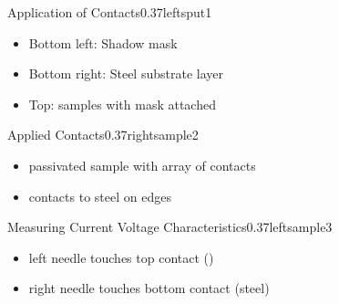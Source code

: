 \documentclass[hyperref={pdfpagelabels=false}, aspectratio=43, t]{beamer}  %
\begin{document}

%
\begin{graphicsFrame}{Application of Contacts}{}{0.37}{left}{sput1}{}
		\begin{itemize}
			\item Bottom left: Shadow mask
			\item Bottom right: Steel substrate  layer
			\item Top: samples with mask attached
		\end{itemize}
\end{graphicsFrame}
%
\begin{graphicsFrame}{Applied Contacts}{}{0.37}{right}{sample2}{}
	\vspace{1em}
		\begin{itemize}
			\item passivated sample with array of contacts
				\vspace{.5em}
			\item contacts to steel on edges
		\end{itemize}
\end{graphicsFrame}
%
\begin{graphicsFrame}{Measuring Current Voltage Characteristics}{}{0.37}{left}{sample3}{}
	\vspace{3em}
		\begin{itemize}
			\item left needle touches top contact ()
				\vspace{1.5em}
			\item right needle touches bottom contact (steel)
		\end{itemize}
\end{graphicsFrame}
\end{document}
